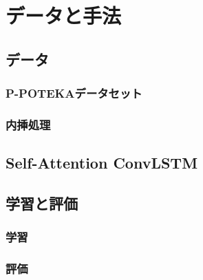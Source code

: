 \section{データと手法}

\subsection{データ}
\subsubsection{P-POTEKAデータセット}
% 
\subsubsection{内挿処理}


\subsection{Self-Attention ConvLSTM}


\subsection{学習と評価}
\subsubsection{学習}

\subsubsection{評価}
